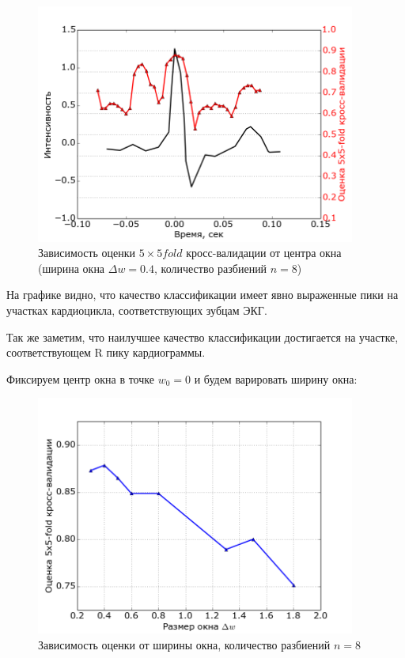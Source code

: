 \documentclass[a4paper,12pt]{extarticle}
\begin{document}
\begin{figure}[H]
    \begin{center}
        \includegraphics[width=105mm]{img/CV_on_window_center.png}
    \end{center}
    \caption{Зависимость оценки $5\times5 fold$ кросс-валидации от центра окна (ширина окна $\Delta w = 0.4$, количество разбиений $n=8$)}
\end{figure}

На графике видно, что качество классификации имеет явно выраженные пики на участках кардиоцикла, соответствующих зубцам ЭКГ.

Так же заметим, что наилучшее качество классификации достигается на участке, соответствующем R пику кардиограммы.

Фиксируем центр окна в точке $w_0 = 0$ и будем варировать ширину окна:

\begin{figure}[H]
    \begin{center}
        \includegraphics[width=105mm]{img/CV_on_window_size.png}
    \end{center}
    \caption{Зависимость оценки от ширины окна, количество разбиений $n=8$}
\end{figure}
\end{document}
